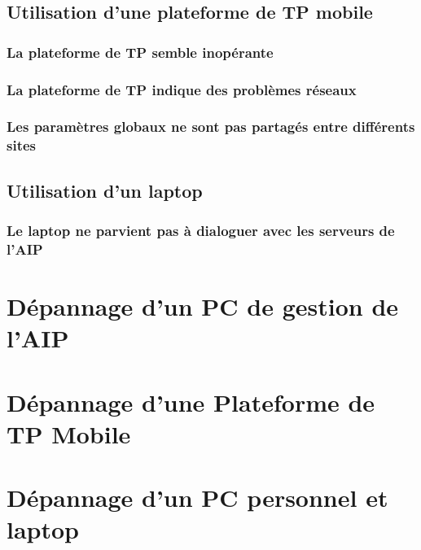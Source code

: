 \documentclass[a4paper]{article}
\begin{document}
\subsection{Utilisation d'une plateforme de TP mobile}
\subsubsection{La plateforme de TP semble inopérante}

\subsubsection{La plateforme de TP indique des problèmes réseaux}

\subsubsection{Les paramètres globaux ne sont pas partagés entre différents sites}

\subsection{Utilisation d'un laptop}

\subsubsection{Le laptop ne parvient pas à dialoguer avec les serveurs de l'AIP}
		

\section{Dépannage d'un PC de gestion de l'AIP}

\section{Dépannage d'une Plateforme de TP Mobile}

\section{Dépannage d'un PC personnel et laptop}
\end{document}
